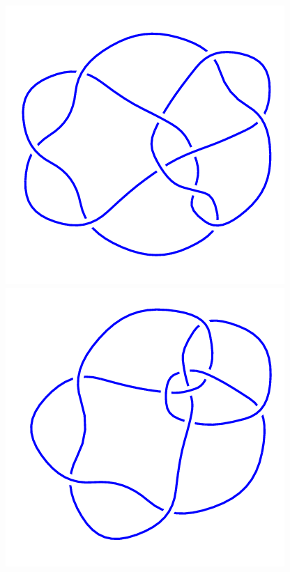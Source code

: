 \begin{figure}[H]
    \begin{minipage}[b]{.18\linewidth}
        \centering
        \includegraphics[width=\linewidth]{../data/10_162.png}
    \end{minipage}
    \begin{minipage}[b]{.18\linewidth}
        \centering
        \includegraphics[width=\linewidth]{../data/10_163.png}

\end{minipage}
\end{figure}

